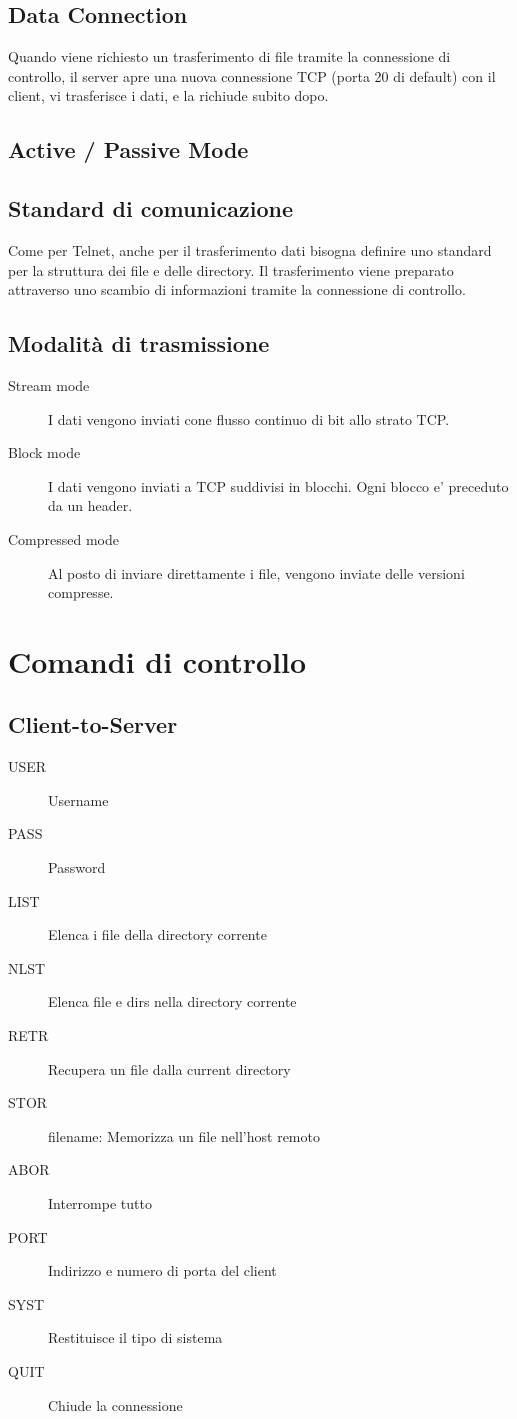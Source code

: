 \subsection{Data Connection}
Quando viene richiesto un trasferimento di file tramite la connessione di controllo, il server apre una nuova connessione TCP (porta 20 di default) con il client, vi trasferisce i dati, e la richiude subito dopo.
\subsection{Active / Passive Mode}
\subsection{Standard di comunicazione}
Come per Telnet, anche per il trasferimento dati bisogna definire uno standard per la struttura dei file e delle directory.
Il trasferimento viene preparato attraverso uno scambio di informazioni tramite la connessione di controllo.
\subsection{Modalità di trasmissione}
\begin{description}
    \item[Stream mode] I dati vengono inviati cone flusso continuo di bit allo strato TCP.
    \item[Block mode] I dati vengono inviati a TCP suddivisi in blocchi. Ogni blocco e' preceduto da un header.
    \item[Compressed mode] Al posto di inviare direttamente i file, vengono inviate delle versioni compresse.  
\end{description}
\section{Comandi di controllo}
\subsection{Client-to-Server}
\begin{description}
    \item[USER] Username
    \item[PASS] Password 
    \item[LIST] Elenca i file della directory corrente
    \item[NLST] Elenca file e dirs nella directory corrente
    \item[RETR] Recupera un file dalla current directory
    \item[STOR] filename: Memorizza un file nell'host remoto
    \item[ABOR] Interrompe tutto
    \item[PORT] Indirizzo e numero di porta del client
    \item[SYST] Restituisce il tipo di sistema
    \item[QUIT] Chiude la connessione 
\end{description}
